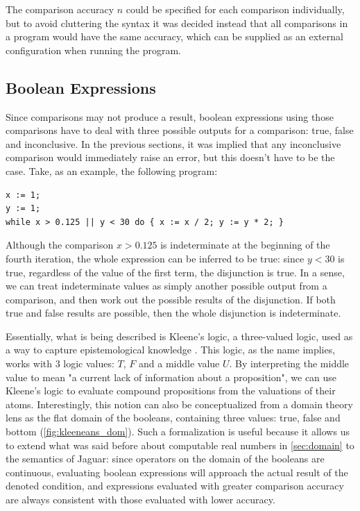 The comparison accuracy $n$ could be specified for each comparison individually, but to avoid cluttering the syntax it was decided instead that all comparisons in a program would have the same accuracy, which can be supplied as an external configuration when running the program.


\subsection{Boolean Expressions}
\label{sec:bool_expr}

Since comparisons may not produce a result, boolean expressions using those comparisons have to deal with three possible outputs for a comparison: true, false and inconclusive. In the previous sections, it was implied that any inconclusive comparison would immediately raise an error, but this doesn't have to be the case. Take, as an example, the following program:

\begin{lstlisting}[caption=Hybrid program showcasing the usefulness of three-valued logic]
x := 1;
y := 1;
while x > 0.125 || y < 30 do { x := x / 2; y := y * 2; }
\end{lstlisting}

Although the comparison $x > 0.125$ is indeterminate at the beginning of the fourth iteration, the whole expression can be inferred to be true: since $y < 30$ is true, regardless of the value of the first term, the disjunction is true. In a sense, we can treat indeterminate values as simply another possible output from a comparison, and then work out the possible results of the disjunction. If both true and false results are possible, then the whole disjunction is indeterminate.

Essentially, what is being described is Kleene's logic, a three-valued logic, used as a way to capture epistemological knowledge \cite{Malinowski14}. This logic, as the name implies, works with 3 logic values: $T$, $F$ and a middle value $U$. By interpreting the middle value to mean "a current lack of information about a proposition", we can use Kleene's logic to evaluate compound propositions from the valuations of their atoms. Interestingly, this notion can also be conceptualized from a domain theory lens as the flat domain of the booleans, containing three values: true, false and bottom (\cref{fig:kleeneans_dom}). Such a formalization is useful because it allows us to extend what was said before about computable real numbers in \cref{sec:domain} to the semantics of Jaguar: since operators on the domain of the booleans are continuous, evaluating boolean expressions will approach the actual result of the denoted condition, and expressions evaluated with greater comparison accuracy are always consistent with those evaluated with lower accuracy.


